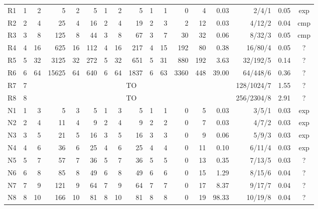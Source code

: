 \begin{table}[t]
\begin{tabular}{@{}lrrrrrrrrrrrrrrrc@{}}
R1 & 1 & 2 & 5 & 2 & 5 & 1 & 2 & 5 & 1 & 1 & 0 & 4 & 0.03 & 2/4/1 & 0.05 & exp\\
R2 & 2 & 4 & 25 & 4 & 16 & 2 & 4 & 19 & 2 & 3 & 2 & 12 & 0.03 & 4/12/2 & 0.04 & cmp\\
R3 & 3 & 8 & 125 & 8 & 44 & 3 & 8 & 67 & 3 & 7 & 30 & 32 & 0.06 & 8/32/3 & 0.05 & cmp\\
R4 & 4 & 16 & 625 & 16 & 112 & 4 & 16 & 217 & 4 & 15 & 192 & 80 & 0.38 & 16/80/4 & 0.05 & ?\\
R5 & 5 & 32 & 3125 & 32 & 272 & 5 & 32 & 651 & 5 & 31 & 880 & 192 & 3.63 & 32/192/5 & 0.14 & ?\\
R6 & 6 & 64 & 15625 & 64 & 640 & 6 & 64 & 1837 & 6 & 63 & 3360 & 448 & 39.00 & 64/448/6 & 0.36 & ?\\
R7 & 7 & \multicolumn{12}{c}{TO} & 128/1024/7 & 1.55 & ?\\
R8 & 8 & \multicolumn{12}{c}{TO} & 256/2304/8 & 2.91 & ?\\
N1 & 1 & 3 & 5 & 3 & 5 & 1 & 3 & 5 & 1 & 1 & 0 & 5 & 0.03 & 3/5/1 & 0.03 & exp\\
N2 & 2 & 4 & 11 & 4 & 9 & 2 & 4 & 9 & 2 & 2 & 0 & 7 & 0.03 & 4/7/2 & 0.03 & exp\\
N3 & 3 & 5 & 21 & 5 & 16 & 3 & 5 & 16 & 3 & 3 & 0 & 9 & 0.06 & 5/9/3 & 0.03 & exp\\
N4 & 4 & 6 & 36 & 6 & 25 & 4 & 6 & 25 & 4 & 4 & 0 & 11 & 0.10 & 6/11/4 & 0.03 & exp\\
N5 & 5 & 7 & 57 & 7 & 36 & 5 & 7 & 36 & 5 & 5 & 0 & 13 & 0.35 & 7/13/5 & 0.03 & ?\\
N6 & 6 & 8 & 85 & 8 & 49 & 6 & 8 & 49 & 6 & 6 & 0 & 15 & 1.29 & 8/15/6 & 0.04 & ?\\
N7 & 7 & 9 & 121 & 9 & 64 & 7 & 9 & 64 & 7 & 7 & 0 & 17 & 8.37 & 9/17/7 & 0.04 & ?\\
N8 & 8 & 10 & 166 & 10 & 81 & 8 & 10 & 81 & 8 & 8 & 0 & 19 & 98.33 & 10/19/8 & 0.04 & ?\\
\bottomrule
\end{tabular}
\end{table}
